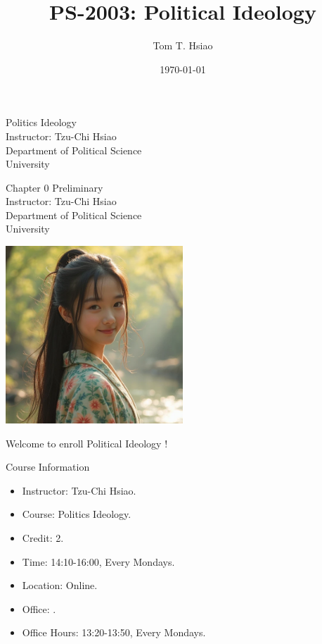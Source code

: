 \documentclass{beamer}
\title{PS-2003: Political Ideology}
\author{Tom T. Hsiao}
\date{\today}
\begin{document}
\begin{frame}
\begin{center}
\Large{Politics Ideology} \\
\vspace{3em}
\normalsize{Instructor: Tzu-Chi Hsiao} \\
\vspace{3em}
\small{Department of Political Science} \\
\vspace{1em}
\small{University}
\end{center}
\end{frame}
\begin{frame}
\begin{center}
\Large{Chapter 0 Preliminary} \\
\vspace{3em}
\normalsize{Instructor: Tzu-Chi Hsiao} \\
\vspace{3em}
\small{Department of Political Science} \\
\vspace{1em}
\small{University} \\
\end{center}
\end{frame}
\begin{frame}{}
\begin{center}
\includegraphics[width=0.5\textwidth]{instructor.png}
\end{center}
\vspace{1em}
\begin{center}
\Large{Welcome to enroll Political Ideology !}
\end{center}
\end{frame}
\begin{frame}{Course Information}
\begin{itemize}
\item Instructor: Tzu-Chi Hsiao.
\item Course: Politics Ideology.
\item Credit: 2.
\item Time: 14:10-16:00, Every Mondays.
\item Location: Online. 
\item Office: .
\item Office Hours: 13:20-13:50, Every Mondays.
\end{itemize}
\end{frame}
\end{document}
